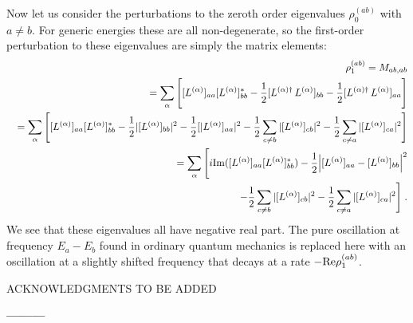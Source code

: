 Now let us consider the perturbations to the zeroth order eigenvalues $\rho_0^{(ab)}$ with $a\neq b$.  For generic energies these are all non-degenerate, so the first-order perturbation to these eigenvalues are simply the matrix elements:
\begin{eqnarray}
&&\rho_1^{(ab)}=M_{ab,ab}\nonumber\\&&
=\sum_\alpha \Bigg[[L^{(\alpha)}]_{aa}[L^{(\alpha)}]^*_{bb}-\frac{1}{2}[L^{(\alpha)\dagger}\,L^{(\alpha)}]_{bb}-\frac{1}{2}[L^{(\alpha)\dagger}\,L^{(\alpha)}]_{aa}\Bigg]\nonumber\\&&=
\sum_\alpha \Bigg[[L^{(\alpha)}]_{aa}[L^{(\alpha)}]^*_{bb}-\frac{1}{2}|[L^{(\alpha)}]_{bb}|^2-\frac{1}{2}[|L^{(\alpha)}]_{aa}|^2-\frac{1}{2}\sum_{c\neq b}|[L^{(\alpha)}]_{cb}|^2-\frac{1}{2}\sum_{c\neq a}|[L^{(\alpha)}]_{ca}|^2\Bigg]\nonumber\\&&=
\sum_\alpha \Bigg[i{\rm Im}([L^{(\alpha)}]_{aa}[L^{(\alpha)}]_{bb}^*)-\frac{1}{2}\Big|[L^{(\alpha)}]_{aa}-[L^{(\alpha)}]_{bb}\Big|^2\nonumber\\&&~~~~~~~~~~~~~~
-\frac{1}{2}\sum_{c\neq b}|[L^{(\alpha)}]_{cb}|^2-\frac{1}{2}\sum_{c\neq a}|[L^{(\alpha)}]_{ca}|^2\Bigg]  \;.
\end{eqnarray}
We see that these eigenvalues all have negative real part.  The pure oscillation at frequency $E_a-E_b$ found in ordinary quantum mechanics is replaced here with an oscillation at a slightly shifted frequency that decays at a rate $-{\rm Re}\rho_1^{(ab)}$.  


\vspace{20pt}

ACKNOWLEDGMENTS TO BE ADDED




\vspace{10pt}

\begin{center}
{\bf ---------}
\end{center}

\vspace{10pt}

